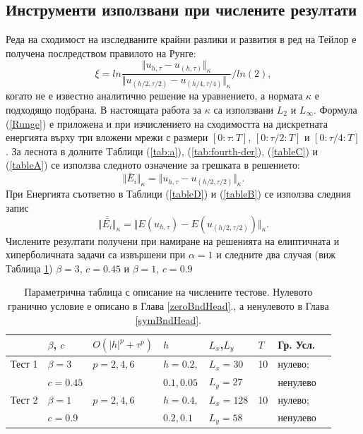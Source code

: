 \documentclass{article}
\newcommand{\rf}[1]{(\ref{#1})}
\theoremstyle{remark}
\begin{document}
\subsection{Инструменти използвани при числените резултати}\label{Instruments}

Реда на сходимост на изследваните крайни разлики и развития в ред на Тейлор е получена послредством правилото на Рунге:
\begin{equation}\label{Runge}
\xi = ln  \frac{\Vert u_{h,\tau} - u_{(h,\tau)} \Vert_\kappa } {\Vert  u_{(h/2,\tau/2)} - u_{(h/4,\tau/4)} \Vert_\kappa  } / ln(2),
\end{equation}
когато не е известно аналитично решение на уравнението, а нормата $\kappa$ е подходящо подбрана. В настоящата работа за $\kappa$ са използвани $L_2$ и $L_\infty$. Формула \rf{Runge} е приложена и при изчислението на сходимостта на дискретната енергията върху три вложени мрежи с размери $[0:\tau:T]$, $[0:\tau/2:T]$ и $[0:\tau/4:T]$. За леснота в долните Tаблици \rf{tab:a}, \rf{tab:fourth-der}, \rf{tableC} и \rf{tableA} се използва следното означение за грешката в решението:
$$\Vert \bar E_i \Vert_\kappa =  \Vert u_{h,\tau} - u_{(h/2,\tau/2)} \Vert_\kappa.$$ 
При Енергията съответно в Таблици \rf{tableD} и \rf{tableB} се използва следния запис
$$\Vert \bar{\bar{ E_i}} \Vert_\kappa=  \Vert E(u_{h,\tau}) - E(u_{(h/2,\tau/2)}) \Vert_\kappa.$$ 
Числените резултати получени при намиране на решенията на елиптичната и хиперболичната задачи са извършени при $\alpha = 1$ и следните два случая (виж Таблица \ref{tableP}) $\beta = 3$, $c=0.45$ и $\beta = 1$, $c=0.9$ \begin{table}
\centering
\small
		\begin{tabular}{||c|l|l|l|l|l|l|l||}
			\hline
			\hline
          &    $\beta$, $c$ 	 & $O(|h|^p+\tau^p)$   &      $h$       	& $L_x$,$L_y$   	&  $T$    	& Гр. Усл.  \\
   			\hline 
			\hline
Тест 1  &      $\beta = 3$   &      $p=2, 4, 6$    	&    $h=0.2,$       	& $L_x = 30$     	&    10    	&    нулево;  \\
          &      $c=0.45$       &                           	&    $ 0.1, 0.05$   	& $L_y=27	$    	&        		&     ненулево 		\\
	   		\hline
			\hline 
Тест 2	&      $\beta = 1$	&      $p=2, 4, 6$    	&     $h=0.4,$      	& $L_x = 128$    &   10    	&   нулево;  \\
           &      $c=0.9$      	&                       		&      $0.2, 0.1$     & $L_y=58$         	&          		&   ненулево   \\
	   \hline
			\hline 
		\end{tabular}
\caption{Параметрична таблица с описание на числените тестове. Нулевото гранично условие е описано в Глава \ref{zeroBndHead}., а ненулевото в Глава \ref{symBndHead}.}
\label{tableP}
\end{table}
\end{document}
